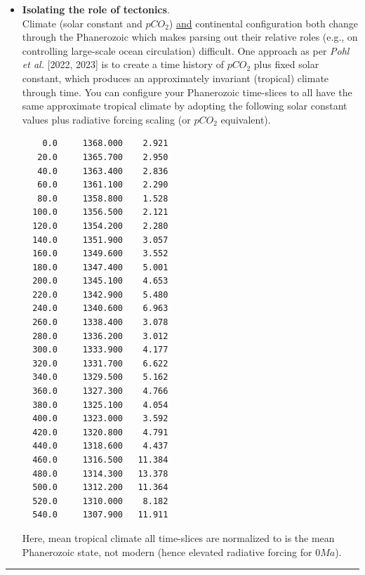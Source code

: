 \begin{itemize}[noitemsep]
\vspace{1mm}
\item \textbf{Isolating the role of tectonics}.
\\Climate (solar constant and $pCO_{2}$) \uline{and} continental configuration both change through the Phanerozoic which makes parsing out their relative roles (e.g., on controlling large-scale ocean circulation) difficult. One approach as per \textit{Pohl et al.} [2022, 2023] is to create a time history of $pCO_{2}$ plus fixed solar constant, which produces an approximately invariant (tropical) climate through time. You can configure your Phanerozoic time-slices to all have the same approximate tropical climate by adopting the following solar constant values plus radiative forcing scaling (or $pCO_{2}$ equivalent).

\newpage

\vspace{-1mm}\footnotesize\begin{verbatim}
    0.0     1368.000    2.921
   20.0     1365.700    2.950
   40.0     1363.400    2.836
   60.0     1361.100    2.290
   80.0     1358.800    1.528
  100.0     1356.500    2.121
  120.0     1354.200    2.280
  140.0     1351.900    3.057
  160.0     1349.600    3.552
  180.0     1347.400    5.001
  200.0     1345.100    4.653
  220.0     1342.900    5.480
  240.0     1340.600    6.963
  260.0     1338.400    3.078
  280.0     1336.200    3.012
  300.0     1333.900    4.177
  320.0     1331.700    6.622
  340.0     1329.500    5.162
  360.0     1327.300    4.766
  380.0     1325.100    4.054
  400.0     1323.000    3.592
  420.0     1320.800    4.791
  440.0     1318.600    4.437
  460.0     1316.500   11.384
  480.0     1314.300   13.378
  500.0     1312.200   11.364
  520.0     1310.000    8.182
  540.0     1307.900   11.911
\end{verbatim}\normalsize\vspace{-1mm}
Here, mean tropical climate all time-slices are normalized to is the mean Phanerozoic state, not modern (hence elevated radiative forcing for $0Ma$).

\end{itemize}

\vspace{1mm}\noindent\rule{4cm}{0.5pt}\vspace{2mm}

